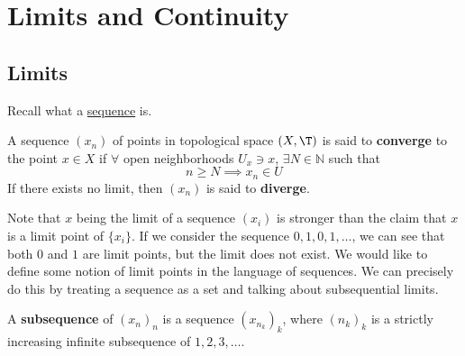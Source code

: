 \section{Limits and Continuity} 

\subsection{Limits} 

  Recall what a \hyperref[st-def:sequence]{sequence} is. 

  \begin{definition}
    A sequence $(x_n)$ of points in topological space $(X, \T)$ is said to \textbf{converge} to the point $x \in X$ if $\forall$ open neighborhoods $U_x \ni x$, $\exists N \in \mathbb{N}$ such that
    \begin{equation}
      n \geq N \implies x_n \in U 
    \end{equation}
    If there exists no limit, then $(x_n)$ is said to \textbf{diverge}. 
  \end{definition}

  Note that $x$ being the limit of a sequence $(x_i)$ is stronger than the claim that $x$ is a limit point of $\{x_i\}$. If we consider the sequence $0, 1, 0, 1, \ldots$, we can see that both $0$ and $1$ are limit points, but the limit does not exist. We would like to define some notion of limit points in the language of sequences. We can precisely do this by treating a sequence as a set and talking about subsequential limits. 

  \begin{definition}[Subsequences]
    A \textbf{subsequence} of $(x_n)_n$ is a sequence $(x_{n_k})_k$, where $(n_k)_k$ is a strictly increasing infinite subsequence of $1, 2, 3, \ldots$. 
  \end{definition}

